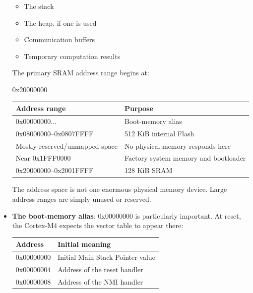 \documentclass{report}
\begin{document}
\begin{itemize}
\begin{itemize}
                \item The stack
                \item The heap, if one is used
                \item Communication buffers
                \item Temporary computation results
            \end{itemize}
            The primary SRAM address range begins at:
            \bigbreak \noindent 
            \begin{ccode}
            0x20000000
            \end{ccode}
            \bigbreak \noindent 
            \begin{center}
                \begin{tabularx}{\textwidth}{@{}XX@{}}
                    \toprule
                    \textbf{Address range}&	\textbf{Purpose} \\
                    \midrule
                    0x00000000...	&Boot-memory alias\\[2ex]
                    0x08000000–0x0807FFFF	&512 KiB internal Flash\\[2ex]
                    Mostly reserved/unmapped space	&No physical memory responds here\\[2ex]
                    Near 0x1FFF0000	&Factory system memory and bootloader\\[2ex]
                    0x20000000–0x2001FFFF	&128 KiB SRAM \\
                    \bottomrule
                \end{tabularx}
            \end{center}
            The address space is not one enormous physical memory device. Large address ranges are simply unused or reserved.
        \item \textbf{The boot-memory alias}: 0x00000000 is particularly important. At reset, the Cortex-M4 expects the vector table to appear there:
            \begin{center}
                \begin{tabularx}{\textwidth}{@{}XX@{}}
                    \toprule
                    \textbf{Address}&	\textbf{Initial meaning} \\
                    \midrule
                    0x00000000	&Initial Main Stack Pointer value\\[2ex]
                    0x00000004	&Address of the reset handler\\[2ex]
                    0x00000008	&Address of the NMI handler\\[2ex]

\end{tabularx}
\end{center}
\end{itemize}
\end{document}
